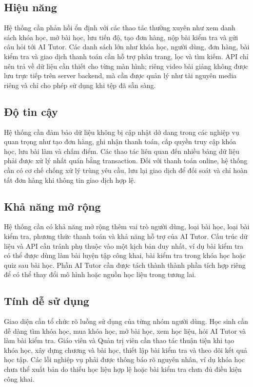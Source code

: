 ﻿\documentclass[../DoAn.tex]{subfiles}
\begin{document}
\subsection{Hiệu năng}
\label{subsection:2.4.2}

Hệ thống cần phản hồi ổn định với các thao tác thường xuyên như xem danh sách khóa học, mở bài học, lưu tiến độ, tạo đơn hàng, nộp bài kiểm tra và gửi câu hỏi tới AI Tutor. Các danh sách lớn như khóa học, người dùng, đơn hàng, bài kiểm tra và giao dịch thanh toán cần hỗ trợ phân trang, lọc và tìm kiếm. API chỉ nên trả về dữ liệu cần thiết cho từng màn hình; riêng video bài giảng không được lưu trực tiếp trên server backend, mà cần được quản lý như tài nguyên media riêng và chỉ cho phép sử dụng khi tệp đã sẵn sàng.

\subsection{Độ tin cậy}
\label{subsection:2.4.3}

Hệ thống cần đảm bảo dữ liệu không bị cập nhật dở dang trong các nghiệp vụ quan trọng như tạo đơn hàng, ghi nhận thanh toán, cấp quyền truy cập khóa học, lưu bài làm và chấm điểm. Các thao tác liên quan đến nhiều bảng dữ liệu phải được xử lý nhất quán bằng transaction. Đối với thanh toán online, hệ thống cần có cơ chế chống xử lý trùng yêu cầu, lưu lại giao dịch để đối soát và chỉ hoàn tất đơn hàng khi thông tin giao dịch hợp lệ.

\subsection{Khả năng mở rộng}
\label{subsection:2.4.4}

Hệ thống cần có khả năng mở rộng thêm vai trò người dùng, loại bài học, loại bài kiểm tra, phương thức thanh toán và khả năng hỗ trợ của AI Tutor. Cấu trúc dữ liệu và API cần tránh phụ thuộc vào một kịch bản duy nhất, ví dụ bài kiểm tra có thể được dùng làm bài luyện tập công khai, bài kiểm tra trong khóa học hoặc quiz sau bài học. Phần AI Tutor cần được tách thành thành phần tích hợp riêng để có thể thay đổi mô hình hoặc nguồn học liệu trong tương lai.

\subsection{Tính dễ sử dụng}
\label{subsection:2.4.5}

Giao diện cần tổ chức rõ luồng sử dụng của từng nhóm người dùng. Học sinh cần dễ dàng tìm khóa học, mua khóa học, mở bài học, xem học liệu, hỏi AI Tutor và làm bài kiểm tra. Giáo viên và Quản trị viên cần thao tác thuận tiện khi tạo khóa học, xây dựng chương và bài học, thiết lập bài kiểm tra và theo dõi kết quả học tập. Các lỗi nghiệp vụ phải được thông báo rõ nguyên nhân, ví dụ khóa học chưa thể xuất bản do thiếu học liệu hợp lệ hoặc bài kiểm tra chưa đủ điều kiện công khai.
\end{document}
